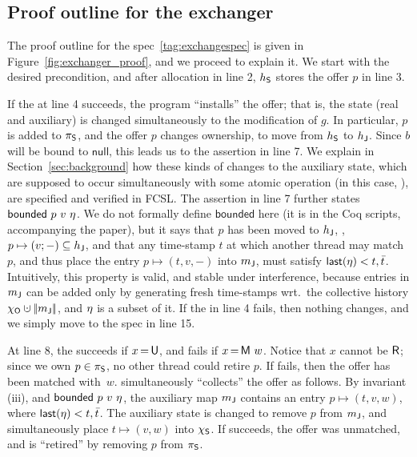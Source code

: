 \subsection{Proof outline for the exchanger}
\label{sec:exproof}

The proof outline for the spec~\eqref{tag:exchangespec} is given in
Figure~\ref{fig:exchanger_proof}, and we proceed to explain it.
%
We start with the desired precondition, and after allocation in line
2, $h_{\mathsf{S}}$ stores the offer $p$ in line 3.

If the  at line 4 succeeds, the program ``installs'' the
offer; that is, the state (real and auxiliary) is changed
simultaneously to the modification of $g$. In particular, $p$ is added
to $\pi_{\mathsf{S}}$, and the offer $p$ changes ownership, to move from
$h_{\mathsf{S}}$ to $h_{\mathsf{J}}$.  Since $b$ will be bound to $\mathsf{null}$,
this leads us to the assertion in line 7. We explain in
Section~\ref{sec:background} how these kinds of changes to the
auxiliary state, which are supposed to occur simultaneously with some
atomic operation (in this case, ), are specified and
verified in FCSL. The assertion in line 7 further states
$\mathsf{bounded}\ p\ v\ \eta$. We do not formally define
$\mathsf{bounded}$ here (it is in the Coq scripts, accompanying the
paper), but it says that $p$ has been moved to $h_{\mathsf{J}}$, \ie,
$p \mapsto (v; -) \subseteq h_{\mathsf{J}}$, and that any time-stamp $t$ at
which another thread may match $p$, and thus place the entry
$p \mapsto (t, v,-)$ into ${m_{\mathsf{J}}}$, must satisfy
$\mathsf{last}(\eta) < t, \bar{t}$. Intuitively, this property is
valid, and stable under interference, because entries in ${m_{\mathsf{J}}}$
can be added only by generating fresh time-stamps wrt.~the collective
history $\histo \hunion \mygather{\pending}$, and $\eta$ is a subset
of it.
%
If the  in line 4 fails, then nothing changes, and we simply move
to the spec in line 15.

At line 8, the  succeeds if $x\,{=}\,{\mathsf{U}}$, and fails if
$x\,{=}\,{\mathsf{M}\ w}$. Notice that $x$ cannot be ${\mathsf{R}}$; since we
own $p \in \pi_{\mathsf{S}}$, no other thread could retire $p$.
%
If  fails, then the offer has been matched with~$w$. 
simultaneously ``collects'' the offer as follows. By invariant (iii),
and $\mathsf{bounded}\ p\ v\ \eta$, the auxiliary map ${m_{\mathsf{J}}}$
contains an entry $p \mapsto (t, v, w)$, where $\mathsf{last}(\eta) <
t, \bar{t}$. The auxiliary state is changed to remove $p$ from
${m_{\mathsf{J}}}$, and simultaneously place $t \mapsto (v, w)$ into $\chi_{\mathsf{S}}$.
%
If  succeeds, the offer was unmatched, and is ``retired'' by
removing $p$ from $\pi_{\mathsf{S}}$.

